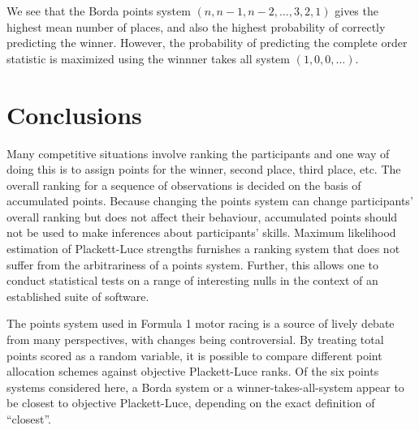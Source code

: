 \documentclass{elsarticle}
\begin{document}
We see that the Borda points system $(n,n-1,n-2,\ldots,3,2,1)$ gives
the highest mean number of places, and also the highest probability of
correctly predicting the winner.  However, the probability of predicting
the complete order statistic is maximized using the winnner takes all
system \((1,0,0,\ldots)\).

\section{Conclusions}

Many competitive situations involve ranking the participants and one
way of doing this is to assign points for the winner, second place,
third place, etc.  The overall ranking for a sequence of observations
is decided on the basis of accumulated points.  Because changing the
points system can change participants' overall ranking but does not
affect their behaviour, accumulated points should not be used to make
inferences about participants' skills.  Maximum likelihood estimation
of Plackett-Luce strengths furnishes a ranking system that does not
suffer from the arbitrariness of a points system.  Further, this
allows one to conduct statistical tests on a range of interesting
nulls in the context of an established suite of software.

The points system used in Formula 1 motor racing is a source of lively
debate from many perspectives, with changes being controversial.  By
treating total points scored as a random variable, it is possible to
compare different point allocation schemes against objective
Plackett-Luce ranks.  Of the six points systems considered here, a
Borda system or a winner-takes-all-system appear to be closest to
objective Plackett-Luce, depending on the exact definition of
``closest''.


\end{document}
